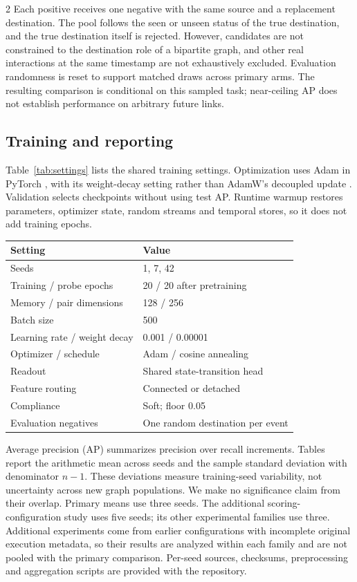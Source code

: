 \documentclass[a4paper,10pt,fleqn]{article}
\renewcommand{\small}{\fontsize{8}{12}\selectfont}
\begin{document}
\begin{multicols}{2}
Each positive receives one negative with the same source and a replacement destination. The pool follows the seen or unseen status of the true destination, and the true destination itself is rejected. However, candidates are not constrained to the destination role of a bipartite graph, and other real interactions at the same timestamp are not exhaustively excluded. Evaluation randomness is reset to support matched draws across primary arms. The resulting comparison is conditional on this sampled task; near-ceiling AP does not establish performance on arbitrary future links.

\subsection{Training and reporting}
Table~\ref{tab:settings} lists the shared training settings. Optimization uses Adam \cite{adam} in PyTorch \cite{pytorch}, with its weight-decay setting rather than AdamW's decoupled update \cite{adamw}. Validation selects checkpoints without using test AP. Runtime warmup restores parameters, optimizer state, random streams and temporal stores, so it does not add training epochs.

\begin{center}
\label{tab:settings}
\small
\begin{tabular}{@{}p{3.5cm}p{3.7cm}@{}}
\toprule
Setting & Value\\ \midrule
Seeds & 1, 7, 42\\
Training / probe epochs & 20 / 20 after pretraining\\
Memory / pair dimensions & 128 / 256\\
Batch size & 500\\
Learning rate / weight decay & 0.001 / 0.00001\\
Optimizer / schedule & Adam / cosine annealing\\
Readout & Shared state-transition head\\
Feature routing & Connected or detached\\
Compliance & Soft; floor 0.05\\
Evaluation negatives & One random destination per event\\
\bottomrule
\end{tabular}
\end{center}

Average precision (AP) summarizes precision over recall increments. Tables report the arithmetic mean across seeds and the sample standard deviation with denominator $n-1$. These deviations measure training-seed variability, not uncertainty across new graph populations. We make no significance claim from their overlap. Primary means use three seeds. The additional scoring-configuration study uses five seeds; its other experimental families use three. Additional experiments come from earlier configurations with incomplete original execution metadata, so their results are analyzed within each family and are not pooled with the primary comparison. Per-seed sources, checksums, preprocessing and aggregation scripts are provided with the repository.


\end{multicols}
\end{document}
